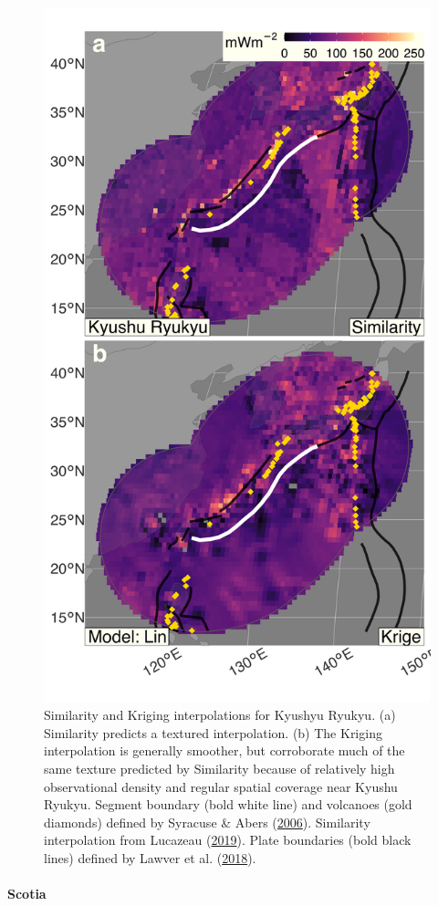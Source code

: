 \begin{figure}[htbp]

{\centering \includegraphics[width=0.62\linewidth,]{assets/figs/chpt3/KyushuRyukyuDiffComp} 

}

\caption[Similarity and Kriging interpolations for Kyushyu Ryukyu]{Similarity and Kriging interpolations for Kyushyu Ryukyu. (a) Similarity predicts a textured interpolation. (b) The Kriging interpolation is generally smoother, but corroborate much of the same texture predicted by Similarity because of relatively high observational density and regular spatial coverage near Kyushu Ryukyu. Segment boundary (bold white line) and volcanoes (gold diamonds) defined by Syracuse \& Abers (\protect\hyperlink{ref-syracuse2006}{2006}). Similarity interpolation from Lucazeau (\protect\hyperlink{ref-lucazeau2019}{2019}). Plate boundaries (bold black lines) defined by Lawver et al. (\protect\hyperlink{ref-lawver2018}{2018}).}\label{fig:kyushuRyukyuDiff}
\end{figure}

\hypertarget{scotia}{%
\paragraph{Scotia}\label{scotia}}

